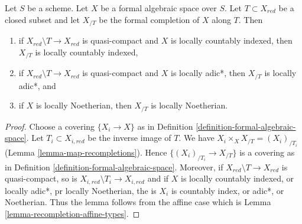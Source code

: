 \begin{lemma}
\label{lemma-recompletion-types}
Let $S$ be a scheme. Let $X$ be a formal algebraic space over $S$.
Let $T \subset X_{red}$ be a closed subset and let $X_{/T}$
be the formal completion of $X$ along $T$. Then
\begin{enumerate}
\item if $X_{red} \setminus T \to X_{red}$ is quasi-compact and $X$
is locally countably indexed, then $X_{/T}$ is locally countably indexed,
\item if $X_{red} \setminus T \to X_{red}$ is quasi-compact and $X$
is locally adic*, then $X_{/T}$ is locally adic*, and
\item if $X$ is locally Noetherian, then $X_{/T}$ is locally Noetherian.
\end{enumerate}
\end{lemma}

\begin{proof}
Choose a covering $\{X_i \to X\}$ as in
Definition \ref{definition-formal-algebraic-space}.
Let $T_i \subset X_{i, red}$ be the inverse image of $T$.
We have $X_i \times_X X_{/T} = (X_i)_{/T_i}$
(Lemma \ref{lemma-map-recompletions}).
Hence $\{(X_i)_{/T_i} \to X_{/T}\}$ is a covering as in
Definition \ref{definition-formal-algebraic-space}.
Moreover, if $X_{red} \setminus T \to X_{red}$ is quasi-compact, so is
$X_{i, red} \setminus T_i \to X_{i, red}$
and if $X$ is locally countably indexed, or locally adic*, pr
locally Noetherian, the is $X_i$ is countably index, or adic*,
or Noetherian. Thus the lemma follows from the affine case which is
Lemma \ref{lemma-recompletion-affine-types}.
\end{proof}















